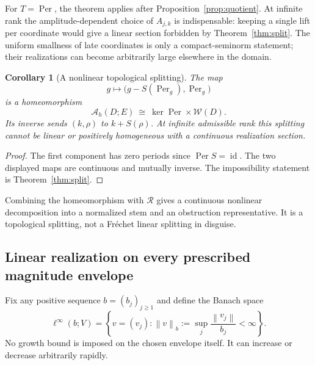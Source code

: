 \documentclass[11pt,a4paper]{article}
\numberwithin{equation}{section}
\newtheorem{corollary}[theorem]{Corollary}
\theoremstyle{definition}
\theoremstyle{remark}
\newcommand{\A}{\mathcal A_h}
\newcommand{\Per}{\operatorname{Per}}
\newcommand{\calW}{\mathscr W}
\newcommand{\norm}[1]{\left\lVert#1\right\rVert}
\newcommand{\id}{\operatorname{id}}
\begin{document}
For $T=\Per$, the theorem applies after
Proposition~\ref{prop:quotient}. At infinite rank the amplitude-dependent
choice of $A_{j,k}$ is indispensable: keeping a single lift per coordinate
would give a linear section forbidden by Theorem~\ref{thm:split}.
The uniform smallness of late coordinates is only a compact-seminorm
statement; their realizations can become arbitrarily large elsewhere in the
domain.

\begin{corollary}[A nonlinear topological splitting]
\label{cor:homeomorphism}
The map
\[
 g\longmapsto\bigl(g-S(\Per_g),\Per_g\bigr)
\]
is a homeomorphism
\begin{equation}\label{eq:homeomorphism}
 \A(D;E)\ \cong\ \ker\Per\times\calW(D).
\end{equation}
Its inverse sends $(k,\rho)$ to $k+S(\rho)$. At infinite admissible rank this
splitting cannot be linear or positively homogeneous with a continuous
realization section.
\end{corollary}
\begin{proof}
The first component has zero periods since $\Per S=\id$. The two displayed
maps are continuous and mutually inverse. The impossibility statement is
Theorem~\ref{thm:split}.
\end{proof}

Combining the homeomorphism with $\mathcal R$ gives a continuous nonlinear
decomposition into a normalized stem and an obstruction representative. It
is a topological splitting, not a Fr\'echet linear splitting in disguise.

\subsection{Linear realization on every prescribed magnitude envelope}

Fix any positive sequence $b=(b_j)_{j\ge1}$ and define the Banach space
\begin{equation}\label{eq:weighted-space}
 \ell^\infty(b;V)=
 \left\{v=(v_j):\norm v_b:=\sup_j\frac{\norm{v_j}}{b_j}<\infty\right\}.
\end{equation}
No growth bound is imposed on the chosen envelope itself. It can increase or
decrease arbitrarily rapidly.
\end{document}
